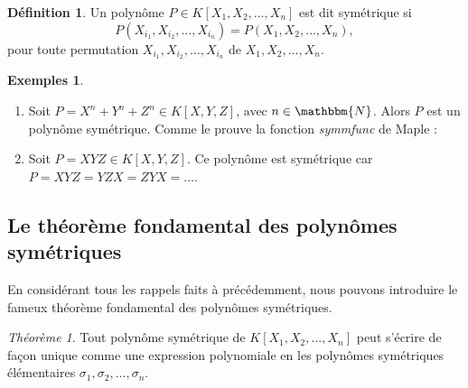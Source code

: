 \documentclass[12pt]{article}
\theoremstyle{remark}\newtheorem{note}{Note}
\theoremstyle{remark}\newtheorem{nota}{Notation}
\newtheorem{theorem}{Théorème}
\theoremstyle{definition}
\newtheorem{definition}{Définition}
\newtheorem*{examples}{Exemples}
\begin{document}
\begin{definition}
Un polynôme $P \in K\left[ X_1, X_2, \ldots , X_n \right] $ est dit symétrique si $$P(X_{i_1}, X_{i_2}, \ldots , X_{i_n}) = P(X_1,X_2,\ldots ,X_n),$$ pour toute permutation $X_{i_1}, X_{i_2}, \ldots , X_{i_n}$ de $X_1,X_2, \ldots ,X_n$.
\end{definition}
\vspace{12pt}
\begin{examples}
\begin{enumerate}
	\item Soit $P = X^{n} + Y^{n} + Z^{n}\in K\left[ X,Y,Z\right]$, avec $n \in \mathbbm{N}$. Alors $P$ est un polynôme symétrique. Comme le prouve la fonction \textsl{symmfunc} de Maple :
		
	\item Soit $P = XYZ \in K\left[ X,Y,Z\right]$. Ce polynôme est symétrique car $P = XYZ = YZX = ZYX = \ldots$.
\end{enumerate}

\end{examples}

\subsection{Le théorème fondamental des polynômes symétriques}
En considérant tous les rappels faits à précédemment, nous pouvons introduire le fameux théorème fondamental des polynômes symétriques.

\begin{theorem}
Tout polynôme symétrique de $K\left[ X_1, X_2, ... , X_n \right]$ peut s'écrire de façon unique comme une expression polynomiale en les polynômes symétriques élémentaires $\sigma_1, \sigma_2,..., \sigma_n$.
\end{theorem}
\end{document}
